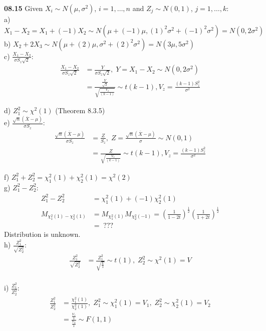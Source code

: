
{ \bf 08.15 } Given $X_i \sim N(\mu, \sigma^2)$, $i=1,\dots, n$ and $Z_j \sim N(0, 1)$, $j=1,\dots, k$:\\

a) $X_1 - X_2 = X_1 + (-1)X_2 \sim N\left(\mu + (-1)\mu, (1)^2\sigma^2 + (-1)^2\sigma^2\right) = N(0, 2\sigma^2)$ \\

b) $X_2 + 2X_3 \sim N\left(\mu + (2)\mu, \sigma^2 + (2)^2\sigma^2\right) = N(3\mu, 5\sigma^2)$\\

c) $\frac{X_1 - X_2}{\sigma S_z \sqrt{2}}$:
\begin{align*}
\frac{X_1 - X_2}{\sigma S_z \sqrt{2}} &= \frac{Y}{\sigma S_z \sqrt{2}},\;Y=X_1 - X_2 \sim N(0, 2\sigma^2)\\
 &= \frac{\frac{Y}{\sqrt{2}}}{\sqrt{\frac{V_z}{(k-1)}}} \sim t(k-1), V_z = \frac{(k-1)S^2_z}{\sigma^2}
\end{align*}

d) $Z^2_1 \sim \chi^2(1)$ (Theorem 8.3.5) \\

e) $\frac{\sqrt{n} (\overline{X} - \mu)}{\sigma S_z}$: \\
\begin{align*}
\frac{\sqrt{n} (\overline{X} - \mu)}{\sigma S_z} &= \frac{Z}{S_z},
  \; Z = \frac{\sqrt{n} (\overline{X} - \mu)}{\sigma} \sim N(0, 1) \\
  &= \frac{Z}{\sqrt{\frac{V_z}{(k-1)}}} \sim t(k-1), V_z = \frac{(k-1)S^2_z}{\sigma^2}
\end{align*}

f) $Z^2_1 + Z^2_2 = \chi^2_1(1) + \chi^2_2(1) = \chi^2(2)$ \\

g) $Z^2_1 - Z^2_2$:
\begin{align*}
Z^2_1 - Z^2_2 &= \chi^2_1(1) + (-1) \chi^2_2(1) \\
M_{\chi^2_1(1) - \chi^2_2(1)} &= M_{\chi^2_1(1)} M_{\chi^2_2(-1)} 
  = \left(\frac{1}{1-2t}\right)^{\frac{1}{2}} \left(\frac{1}{1+2t}\right)^{\frac{1}{2}} \\
  &=\; ???
\end{align*}
Distribution is unknown.\\

h) $\frac{Z^2_1}{\sqrt{Z^2_2}}$:
\begin{align*}
\frac{Z^2_1}{\sqrt{Z^2_2}} &= \frac{Z^2_1}{\sqrt{\frac{V}{1}}} \sim t(1),\; Z^2_2\sim \chi^2(1) = V \\
\end{align*}

i) $\frac{Z^2_1}{Z^2_2}$:
\begin{align*}
\frac{Z^2_1}{Z^2_2} &= \frac{\chi^2_1(1)}{\chi^2_2(1)},
  \; Z^2_1 \sim \chi^2_1(1) = V_1,\; Z^2_2 \sim \chi^2_2(1) = V_2 \\
  &= \frac{\frac{V_1}{1}}{\frac{V_2}{1}} \sim F(1, 1)
\end{align*}
